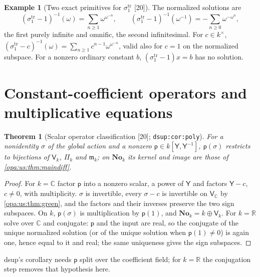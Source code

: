 \documentclass[11pt,oneside]{article}
\numberwithin{equation}{section}
\newtheorem{theorem}{Theorem}[section]
\theoremstyle{definition}
\newtheorem{example}[example]{Example}
\theoremstyle{remark}
\newcommand{\No}{\mathbf{No}}
\newcommand{\R}{\mathbb R}
\newcommand{\C}{\mathbb C}
\newcommand{\mm}{\mathfrak m}
\newcommand{\src}[1]{\textup{\textsf{\small[#1]}}}
\newcommand{\lbl}[1]{\nolinkurl{#1}}
\begin{document}
\begin{example}[Two exact primitives for $\sigma^{\mathrm{tr}}_1$ \src{20}]\label{opa:us:ex:primitives}
The normalized solutions are
\begin{equation}\label{opa:us:eq:primitives}
 (\sigma^{\mathrm{tr}}_1-1)^{-1}(\omega)=\sum_{n\ge1}\omega^{\omega^{-n}},\qquad (\sigma^{\mathrm{tr}}_1-1)^{-1}(\omega^{-1})=-\sum_{n\ge0}\omega^{-\omega^n},
\end{equation}
the first purely infinite and omnific, the second infinitesimal. For $c\in k^\times$, $(\sigma^{\mathrm{tr}}_1-c)^{-1}(\omega)=\sum_{n\ge1}c^{n-1}\omega^{\omega^{-n}}$,
valid also for $c=1$ on the normalized subspace. For a nonzero ordinary constant $b$, $(\sigma^{\mathrm{tr}}_1-1)x=b$ has no solution.
\end{example}

\section{Constant-coefficient operators and multiplicative equations}\label{opa:us:sec:operators}

\begin{theorem}[Scalar operator classification \src{20}; \lbl{dsup:cor:poly}]\label{opa:us:thm:operators}
For a nonidentity $\sigma$ of the global action and a nonzero $\mathsf p\in k[\mathsf Y,\mathsf Y^{-1}]$, $\mathsf p(\sigma)$ restricts to bijections of
$\mathsf V_k$, $\Pi_k$ and $\mm_k$; on $\No_k$ its kernel and image are those of \cref{opa:us:thm:maindiff}.
\end{theorem}
\begin{proof}
For $k=\C$ factor $\mathsf p$ into a nonzero scalar, a power of $\mathsf Y$ and factors $\mathsf Y-c$, $c\ne0$, with multiplicity. $\sigma$ is invertible, every
$\sigma-c$ is invertible on $\mathsf V_\C$ by \cref{opa:us:thm:green}, and the factors and their inverses preserve the two sign subspaces. On $k$,
$\mathsf p(\sigma)$ is multiplication by $\mathsf p(1)$, and $\No_k=k\oplus\mathsf V_k$. For $k=\R$ solve over $\C$ and conjugate: $\mathsf p$ and the input are
real, so the conjugate of the unique normalized solution (or of the unique solution when $\mathsf p(1)\ne0$) is again one, hence equal to it and
real; the same uniqueness gives the sign subspaces.
\end{proof}

dsup's corollary needs $\mathsf p$ split over the coefficient field; for $k=\R$ the conjugation step removes that hypothesis here.
\end{document}
